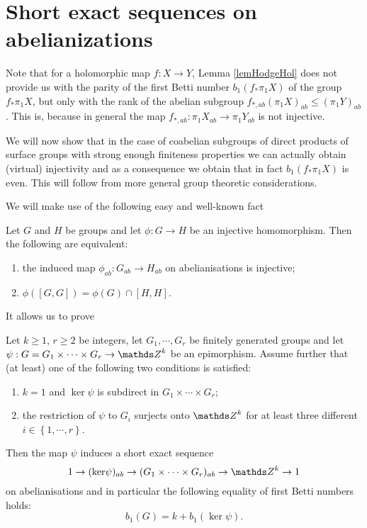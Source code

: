 \section{Short exact sequences on abelianizations}
\label{secSESCoab}
Note that for a holomorphic map $f: X\rightarrow Y$, Lemma \ref{lemHodgeHol} does not provide us with the parity of the first Betti number $b_1(f_{\ast}\pi_1X)$ of the group $f_{\ast}\pi_1 X$, but only with the rank of the abelian subgroup $f_{\ast,ab}(\pi_1X)_{ab}\leq (\pi_1Y)_{ab}$. This is, because in general the map $f_{\ast,ab}:\pi_1 X_{ab} \rightarrow \pi_1 Y_{ab}$ is not injective. 

We will now show that in the case of coabelian subgroups of direct products of surface groups with strong enough finiteness properties we can actually obtain (virtual) injectivity and as a consequence we obtain that in fact $b_1(f_{\ast}\pi_1 X)$ is even. This will follow from more general group theoretic considerations.

We will make use of the following easy and well-known fact

\begin{lemma}
 Let $G$ and $H$ be groups and let $\phi: G\rightarrow H$ be an injective homomorphism. Then the following are equivalent:
 
 \begin{enumerate}
  \item the induced map $\phi_{ab}: G_{ab}\rightarrow H_{ab}$ on abelianisations is injective;
  \item $\phi(\left[G,G\right])=\phi(G)\cap \left[H,H\right]$.
 \end{enumerate}
 \label{lemInjonAbel}
\end{lemma}


It allows us to prove

\begin{proposition}
 Let $k\geq 1$, $r\geq 2$ be integers, let $G_1,\cdots, G_r$ be finitely generated groups and let $\psi : G=G_1\times \cdots \times G_r \rightarrow \ZZ^k$ be an epimorphism. Assume further that (at least) one of the following two conditions is satisfied:
 \begin{enumerate}
  \item $k=1$ and $\ker \psi$ is subdirect in $G_1\times \cdots \times G_r$;
  \item the restriction of $\psi$ to $G_i$ surjects onto $\ZZ^k$ for at least three different $i\in \left\{1,\cdots, r\right\}$.
 \end{enumerate}
 
 Then the map $\psi$ induces a short exact sequence 
 \begin{equation}
  1\rightarrow (\ker \psi)_{ab}\rightarrow (G_1\times \cdots \times G_r)_{ab}\rightarrow \ZZ^k\rightarrow 1
  \label{eqnSESab1}
 \end{equation}
 on abelianisations and in particular the following equality of first Betti numbers holds:
 \begin{equation}
  b_1(G)=k+ b_1(\ker \psi).
  \label{eqnBetti1}
 \end{equation}  
 \label{thmBettiZ}
\end{proposition}

